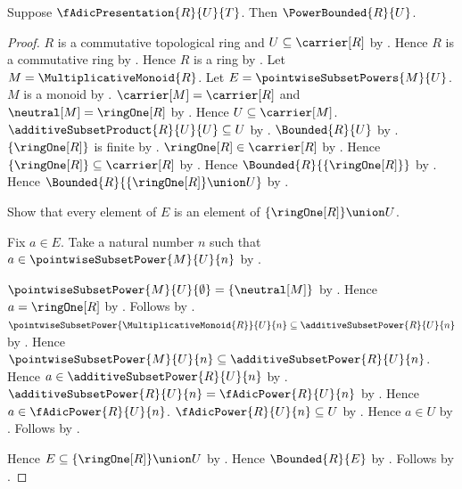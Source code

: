 \begin{theorem}\label{f_adic_presentation_subset_power_bounded}
    Suppose $\fAdicPresentation{R}{U}{T}$.
    Then $\PowerBounded{R}{U}$.
\end{theorem}
\begin{proof}
    $R$ is a commutative topological ring and
        $U\subseteq\carrier[R]$ by .
    Hence $R$ is a commutative ring by
        .
    Hence $R$ is a ring by .
    Let $M=\MultiplicativeMonoid{R}$.
    Let $E=\pointwiseSubsetPowers{M}{U}$.
    $M$ is a monoid by .
    $\carrier[M]=\carrier[R]$ and $\neutral[M]=\ringOne[R]$ by
        .
    Hence $U\subseteq\carrier[M]$.
    $\additiveSubsetProduct{R}{U}{U}\subseteq U$ by
        .
    $\Bounded{R}{U}$ by .
    $\{\ringOne[R]\}$ is finite by .
    $\ringOne[R]\in\carrier[R]$ by .
    Hence $\{\ringOne[R]\}\subseteq\carrier[R]$ by
        .
    Hence $\Bounded{R}{\{\ringOne[R]\}}$ by
        .
    Hence $\Bounded{R}{\{\ringOne[R]\}\union U}$ by
        .

    Show that every element of $E$ is an element of
        $\{\ringOne[R]\}\union U$.
    \begin{subproof}
        Fix $a\in E$.
        Take a natural number $n$ such that
            $a\in\pointwiseSubsetPower{M}{U}{n}$ by
            .
        \begin{byCase}
                $\pointwiseSubsetPower{M}{U}{\emptyset}
                    =\{\neutral[M]\}$ by
                    .
                Hence $a=\ringOne[R]$ by
                    .
                Follows by .
                $\pointwiseSubsetPower{\MultiplicativeMonoid{R}}{U}{n}
                    \subseteq\additiveSubsetPower{R}{U}{n}$ by
                    .
                Hence $\pointwiseSubsetPower{M}{U}{n}
                    \subseteq\additiveSubsetPower{R}{U}{n}$.
                Hence $a\in\additiveSubsetPower{R}{U}{n}$ by
                    .
                $\additiveSubsetPower{R}{U}{n}
                    =\fAdicPower{R}{U}{n}$ by .
                Hence $a\in\fAdicPower{R}{U}{n}$.
                $\fAdicPower{R}{U}{n}\subseteq U$ by
                    .
                Hence $a\in U$ by .
                Follows by .
        \end{byCase}
    \end{subproof}
    Hence $E\subseteq\{\ringOne[R]\}\union U$ by .
    Hence $\Bounded{R}{E}$ by .
    Follows by .
\end{proof}

